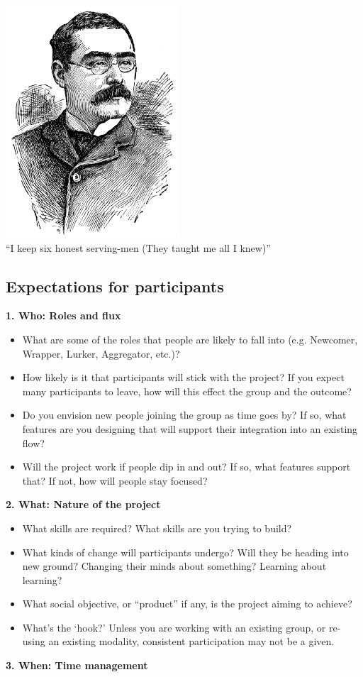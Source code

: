 \begin{center}
\includegraphics[width=.5\textwidth]{../pictures/kipling.jpg} \\
``I keep six honest serving-men (They taught me all I knew)''
\end{center}

\subsection{Expectations for participants}

\textbf{1. Who: Roles and flux}

\begin{itemize}
\item
  What are some of the roles that people are likely to fall into (e.g.
  Newcomer, Wrapper, Lurker, Aggregator, etc.)?
\item
  How likely is it that participants will stick with the project? If you
  expect many participants to leave, how will this effect the group and
  the outcome?
\item
  Do you envision new people joining the group as time goes by? If so,
  what features are you designing that will support their integration
  into an existing flow?
\item
  Will the project work if people dip in and out? If so, what features
  support that? If not, how will people stay focused?
\end{itemize}
\textbf{2. What: Nature of the project}

\begin{itemize}
\item
  What skills are required? What skills are you trying to build?
\item
  What kinds of change will participants undergo? Will they be heading
  into new ground? Changing their minds about something? Learning about
  learning?
\item
  What social objective, or ``product'' if any, is the project aiming to
  achieve?
\item
  What's the `hook?' Unless you are working with an existing group, or
  re-using an existing modality, consistent participation may not be a
  given.
\end{itemize}
\textbf{3. When: Time management}

